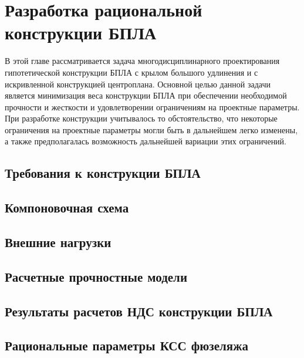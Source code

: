 \chapter{Разработка рациональной конструкции БПЛА}

В этой главе рассматривается задача многодисциплинарного проектирования гипотетической конструкции БПЛА с крылом большого удлинения и с искривленной конструкцией центроплана.  Основной целью данной задачи является минимизация веса конструкции БПЛА при обеспечении необходимой прочности и жесткости и удовлетворении ограничениям на проектные параметры. При разработке конструкции учитывалось то обстоятельство, что некоторые ограничения на проектные параметры могли быть в дальнейшем легко изменены, а также предполагалась возможность дальнейшей вариации этих ограничений.


\section{Требования к конструкции БПЛА}



\section{Компоновочная схема}
	

\section{Внешние нагрузки}
\label{sec:externalLoads}



\section{Расчетные прочностные модели}




\section{Результаты расчетов НДС конструкции БПЛА} 


\section{Рациональные параметры КСС фюзеляжа}
